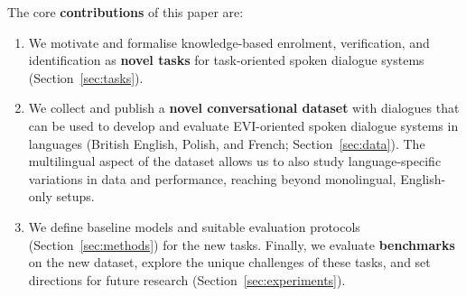 \documentclass[11pt]{article}
\begin{document}
The core \textbf{contributions} of this paper are:
\begin{enumerate}[topsep=1pt,itemsep=-1ex,partopsep=1ex,parsep=1ex]
   \item We motivate and formalise knowledge-based enrolment, verification, and identification as \textbf{novel tasks} for task-oriented spoken dialogue systems (Section~\ref{sec:tasks}).
   \item We collect and publish a \textbf{novel conversational dataset} with  dialogues that can be used to develop and evaluate EVI-oriented spoken dialogue systems in  languages (British English, Polish, and French; Section~\ref{sec:data}). The multilingual aspect of the dataset allows us to also study language-specific variations in data and performance, reaching beyond monolingual, English-only setups.
   \item {We define baseline models and suitable evaluation protocols (Section~\ref{sec:methods}) for the new tasks.
   Finally, we evaluate \textbf{benchmarks} on the new dataset,
   explore the unique challenges of these tasks,
   and set directions for future research (Section~\ref{sec:experiments})}.
\end{enumerate}
\end{document}
